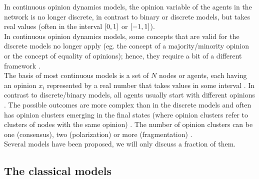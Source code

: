 \documentclass[11 pt , letterpaper , twoside , openright]{book}
\begin{document}
In continuous opinion dynamics models, the opinion variable of the agents in the network is no longer discrete, in contrast to binary or discrete models, but takes real values (often in the interval $\interval{0}{1}$ or $\interval{-1}{1}$).\\
In continuous opinion dynamics models, some concepts that are valid for the discrete models no longer apply (eg. the concept of a majority/minority opinion or the concept of equality of opinions); hence, they require a bit of a different framework \cite{Castellano2009}. \\
The basis of most continuous models is a set of $N$ nodes or agents, each having an opinion $x_i$ represented by a real number that takes values in some interval \cite{Castellano2009}. In contrast to discrete/binary models, all agents usually start with  different opinions \cite{Castellano2009}. The possible outcomes are more complex than in the discrete models and often has opinion clusters emerging in the final states (where opinion clusters refer to clusters of nodes with the same opinion) \cite{Castellano2009}. The number of opinion clusters can be one (consensus), two (polarization) or more (fragmentation) \cite{Castellano2009}. \\
Several models have been proposed, we will only discuss a fraction of them.

\subsection{The classical models}\label{classMod}
\end{document}
